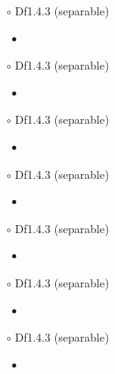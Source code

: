 \documentclass{article}
\begin{document}
{\Large $\circ $ Df1.4.3 (separable)}\par
\begin{itemize}
    \item[]
    {\large }
    {\textcolor{pf}{}}
\end{itemize}\par
\quad

{\Large $\circ $ Df1.4.3 (separable)}\par
\begin{itemize}
    \item[]
    {\large }
    {\textcolor{pf}{}}
\end{itemize}\par
\quad

{\Large $\circ $ Df1.4.3 (separable)}\par
\begin{itemize}
    \item[]
    {\large }
    {\textcolor{pf}{}}
\end{itemize}\par
\quad

{\Large $\circ $ Df1.4.3 (separable)}\par
\begin{itemize}
    \item[]
    {\large }
    {\textcolor{pf}{}}
\end{itemize}\par
\quad

{\Large $\circ $ Df1.4.3 (separable)}\par
\begin{itemize}
    \item[]
    {\large }
    {\textcolor{pf}{}}
\end{itemize}\par
\quad

{\Large $\circ $ Df1.4.3 (separable)}\par
\begin{itemize}
    \item[]
    {\large }
    {\textcolor{pf}{}}
\end{itemize}\par
\quad

{\Large $\circ $ Df1.4.3 (separable)}\par
\begin{itemize}
    \item[]
    {\large }
    {\textcolor{pf}{}}
\end{itemize}\par
\quad
\end{document}
